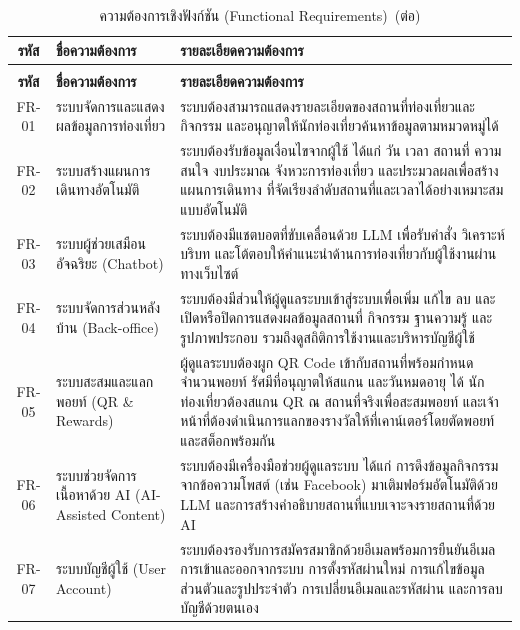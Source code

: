 \begin{longtable}{|c|p{4cm}|p{7cm}|}
\caption{ความต้องการเชิงฟังก์ชัน (Functional Requirements)}\label{tab:func_req}\\
\hline
\textbf{รหัส} & \textbf{ชื่อความต้องการ} & \textbf{รายละเอียดความต้องการ} \\
\hline
\endfirsthead
\caption[]{ความต้องการเชิงฟังก์ชัน (Functional Requirements)~(\textnormal{ต่อ})}\\
\hline
\textbf{รหัส} & \textbf{ชื่อความต้องการ} & \textbf{รายละเอียดความต้องการ} \\
\hline
\endhead
FR-01 & ระบบจัดการและแสดงผลข้อมูลการท่องเที่ยว & ระบบต้องสามารถแสดงรายละเอียดของสถานที่ท่องเที่ยวและกิจกรรม และอนุญาตให้นักท่องเที่ยวค้นหาข้อมูลตามหมวดหมู่ได้ \\ \hline
FR-02 & ระบบสร้างแผนการเดินทางอัตโนมัติ & ระบบต้องรับข้อมูลเงื่อนไขจากผู้ใช้ ได้แก่ วัน เวลา สถานที่ ความสนใจ งบประมาณ จังหวะการท่องเที่ยว และประมวลผลเพื่อสร้างแผนการเดินทาง ที่จัดเรียงลำดับสถานที่และเวลาได้อย่างเหมาะสมแบบอัตโนมัติ \\ \hline
FR-03 & ระบบผู้ช่วยเสมือนอัจฉริยะ (Chatbot) & ระบบต้องมีแชตบอตที่ขับเคลื่อนด้วย LLM เพื่อรับคำสั่ง วิเคราะห์บริบท และโต้ตอบให้คำแนะนำด้านการท่องเที่ยวกับผู้ใช้งานผ่านทางเว็บไซต์ \\ \hline
FR-04 & ระบบจัดการส่วนหลังบ้าน (Back-office) & ระบบต้องมีส่วนให้ผู้ดูแลระบบเข้าสู่ระบบเพื่อเพิ่ม แก้ไข ลบ และเปิดหรือปิดการแสดงผลข้อมูลสถานที่ กิจกรรม ฐานความรู้ และรูปภาพประกอบ รวมถึงดูสถิติการใช้งานและบริหารบัญชีผู้ใช้ \\ \hline
FR-05 & ระบบสะสมและแลกพอยท์ (QR \& Rewards) & ผู้ดูแลระบบต้องผูก QR Code เข้ากับสถานที่พร้อมกำหนดจำนวนพอยท์ รัศมีที่อนุญาตให้สแกน และวันหมดอายุ ได้ นักท่องเที่ยวต้องสแกน QR ณ สถานที่จริงเพื่อสะสมพอยท์ และเจ้าหน้าที่ต้องดำเนินการแลกของรางวัลให้ที่เคาน์เตอร์โดยตัดพอยท์และสต็อกพร้อมกัน \\ \hline
FR-06 & ระบบช่วยจัดการเนื้อหาด้วย AI (AI-Assisted Content) & ระบบต้องมีเครื่องมือช่วยผู้ดูแลระบบ ได้แก่ การดึงข้อมูลกิจกรรมจากข้อความโพสต์ (เช่น Facebook) มาเติมฟอร์มอัตโนมัติด้วย LLM และการสร้างคำอธิบายสถานที่แบบเจาะจงรายสถานที่ด้วย AI \\ \hline
FR-07 & ระบบบัญชีผู้ใช้ (User Account) & ระบบต้องรองรับการสมัครสมาชิกด้วยอีเมลพร้อมการยืนยันอีเมล การเข้าและออกจากระบบ การตั้งรหัสผ่านใหม่ การแก้ไขข้อมูลส่วนตัวและรูปประจำตัว การเปลี่ยนอีเมลและรหัสผ่าน และการลบบัญชีด้วยตนเอง \\ \hline

\end{longtable}

